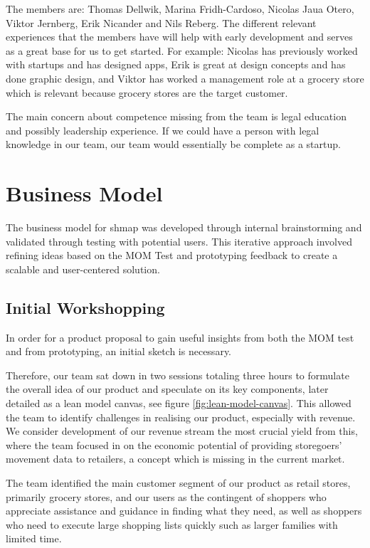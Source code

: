 \documentclass[titlepage]{article}
\begin{document}
The members are: Thomas Dellwik, Marina Fridh-Cardoso, Nicolas Jaua Otero, Viktor Jernberg, Erik Nicander and Nils Reberg. The different relevant experiences that the members have will help with early development and serves as a great base for us to get started. For example: Nicolas has previously worked with startups and has designed apps, Erik is great at design concepts and has done graphic design, and Viktor has worked a management role at a grocery store which is relevant because grocery stores are the target customer.

The main concern about competence missing from the team  is legal education and possibly leadership experience. If we could have a person with legal knowledge in our team, our team would essentially be complete as a startup.

\section{Business Model}

The business model for shmap was developed through internal brainstorming and validated through testing with potential users. 
This iterative approach involved refining ideas based on the MOM Test and prototyping feedback to create a scalable and user-centered solution.

\subsection{Initial Workshopping}

In order for a product proposal to gain useful insights from both the MOM test and from prototyping, an initial sketch is necessary. 

Therefore, our team sat down in two sessions totaling three hours to formulate the overall idea of our product and speculate on its key components, later detailed as a lean model canvas, see figure \ref{fig:lean-model-canvas}.
This allowed the team to identify challenges in realising our product, especially with revenue. 
We consider development of our revenue stream the most crucial yield from this, where the team focused in on the economic potential of providing storegoers' movement data to retailers, a concept which is missing in the current market.

The team identified the main customer segment of our product as retail stores, primarily grocery stores, and our users as the contingent of shoppers who appreciate assistance and guidance in finding what they need, as well as shoppers who need to execute large shopping lists quickly such as larger families with limited time.
\end{document}
